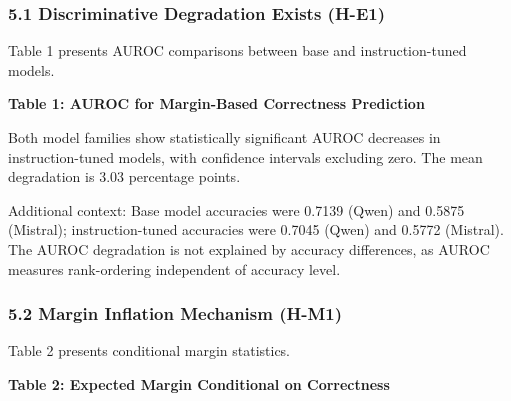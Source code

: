 
\subsubsection{5.1 Discriminative Degradation Exists (H-E1)}

Table 1 presents AUROC comparisons between base and instruction-tuned models.

\textbf{Table 1: AUROC for Margin-Based Correctness Prediction}

\begin{table}[htbp]
\centering
{}
\end{table}

Both model families show statistically significant AUROC decreases in instruction-tuned models, with confidence intervals excluding zero. The mean degradation is 3.03 percentage points.

Additional context: Base model accuracies were 0.7139 (Qwen) and 0.5875 (Mistral); instruction-tuned accuracies were 0.7045 (Qwen) and 0.5772 (Mistral). The AUROC degradation is not explained by accuracy differences, as AUROC measures rank-ordering independent of accuracy level.

\subsubsection{5.2 Margin Inflation Mechanism (H-M1)}

Table 2 presents conditional margin statistics.

\textbf{Table 2: Expected Margin Conditional on Correctness}

\begin{table}[htbp]
\centering
{}
\end{table}

